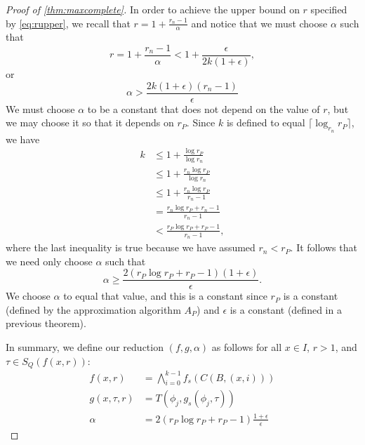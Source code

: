\documentclass[]{article}
\theoremstyle{plain}
\theoremstyle{definition}
\newcommand{\ceil}[1]{\lceil{#1}\rceil}
\begin{document}
\begin{proof}[Proof of \autoref{thm:maxcomplete}]
  In order to achieve the upper bound on $r$ specified by \autoref{eq:rupper}, we recall that $r = 1 + \frac{r_n - 1}{\alpha}$ and notice that we must choose $\alpha$ such that
  \begin{equation*}
    r = 1 + \frac{r_n - 1}{\alpha} < 1 + \frac{\epsilon}{2k(1 + \epsilon)},
  \end{equation*}
  or
  \begin{equation*}
    \alpha > \frac{2k(1 + \epsilon)(r_n - 1)}{\epsilon}
  \end{equation*}
  We must choose $\alpha$ to be a constant that does not depend on the value of $r$, but we may choose it so that it depends on $r_P$.
  Since $k$ is defined to equal $\ceil{\log_{r_n}{r_P}}$, we have
  \begin{align*}
    k & \leq 1 + \frac{\log{r_P}}{\log{r_n}} \\
    & \leq 1 + \frac{r_n \log{r_P}}{\log{r_n}} \\
    & \leq 1 + \frac{r_n \log{r_P}}{r_n - 1} \\
    & = \frac{r_n \log{r_P} + r_n - 1}{r_n - 1} \\
    & < \frac{r_P \log{r_P} + r_P - 1}{r_n - 1},
  \end{align*}
  where the last inequality is true because we have assumed $r_n < r_P$.
  It follows that we need only choose $\alpha$ such that
  \begin{equation*}
    \alpha \geq \frac{2(r_P \log{r_P} + r_P - 1)(1 + \epsilon)}{\epsilon}.
  \end{equation*}
  We choose $\alpha$ to equal that value, and this is a constant since $r_P$ is a constant (defined by the approximation algorithm $A_P$) and $\epsilon$ is a constant (defined in a previous theorem).

  In summary, we define our reduction $(f, g, \alpha)$ as follows for all $x \in I$, $r > 1$, and $\tau \in S_Q(f(x, r))$:
  \begin{align*}
    f(x, r) & = \bigwedge_{i = 0}^{k - 1}{f_s(C(B, (x, i)))} \\
    g(x, \tau, r) & = T(\phi_j, g_s(\phi_j, \tau)) \\
    \alpha & = 2(r_P \log{r_P} + r_P - 1)\frac{1 + \epsilon}{\epsilon}
  \end{align*}
\end{proof}
\end{document}

